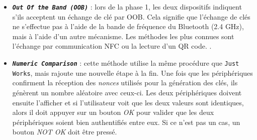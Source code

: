\begin{itemize}
    
    \item \texttt{\textit{\textbf{Out Of the Band (OOB)}}} : lors de la phase 1, les deux dispositifs indiquent s'ils acceptent un échange de clé par OOB. Cela signifie que l'échange de clés ne s'effectue pas à l'aide de la bande de fréquence du Bluetooth (2.4 GHz), mais à l'aide d'un autre mécanisme. Les méthodes les plus connues sont l'échange par communication NFC ou la lecture d'un QR code. \cite{microchip_ble_security:online} \cite{ble_basic_intro:online}.
    
    
    \item \texttt{\textit{\textbf{Numeric Comparison}}} : cette méthode utilise la même procédure que \texttt{Just Works}, mais rajoute une nouvelle étape à la fin. Une fois que les périphériques confirment la réception des \textit{nonces} utilisés pour la génération des clés, ils génèrent un nombre aléatoire avec ceux-ci. Les deux périphériques doivent ensuite l'afficher et si l'utilisateur voit que les deux valeurs sont identiques, alors il doit appuyer sur un bouton \textit{OK} pour valider que les deux périphériques soient bien authentifiés entre eux. Si ce n'est pas un cas, un bouton \textit{NOT OK} doit être pressé. \\
    
\end{itemize}

